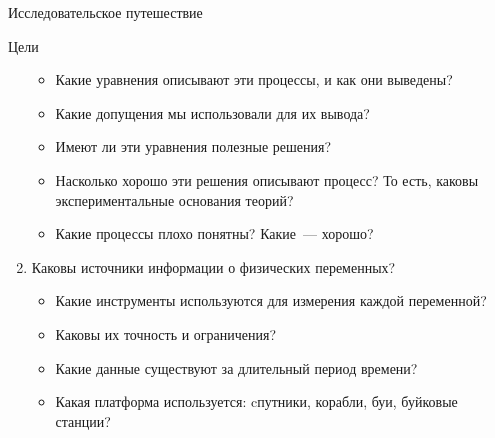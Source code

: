 \begin{chapter}{Исследовательское путешествие}
\begin{section}{Цели}
\begin{enumerate}
\begin{itemize}
  \item
  Какие уравнения описывают эти процессы, и как они выведены? 
%

  \item
  Какие допущения мы использовали для их вывода? 
%

  \item
  Имеют ли эти уравнения полезные решения? 
%

  \item
  Насколько хорошо эти решения описывают процесс? То есть, каковы 
  экспериментальные основания теорий? 
%

  \item
  Какие процессы плохо понятны? Какие~--- хорошо?
%
\end{itemize}

\item
Каковы источники информации о физических переменных?
%

\begin{itemize}
  \item
  Какие инструменты используются для измерения каждой переменной? 
%

  \item
  Каковы их точность и ограничения? 
%

  \item
  Какие данные существуют за длительный период времени? 
%

  \item
  Какая платформа используется: cпутники, корабли, буи, буйковые станции?
%
\end{itemize}


\end{enumerate}
\end{section}
\end{chapter}
